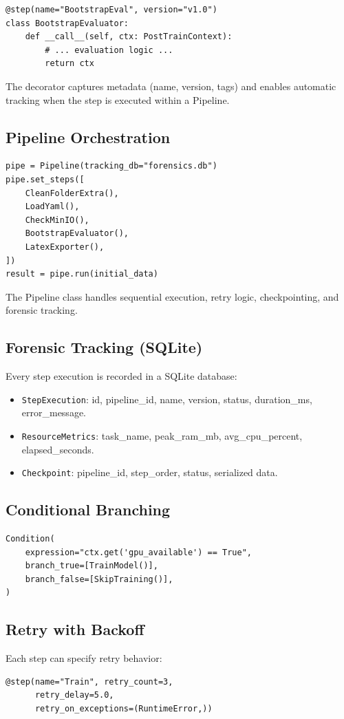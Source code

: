\documentclass[10pt,twocolumn,letterpaper]{article}
\begin{document}
\begin{verbatim}
@step(name="BootstrapEval", version="v1.0")
class BootstrapEvaluator:
    def __call__(self, ctx: PostTrainContext):
        # ... evaluation logic ...
        return ctx
\end{verbatim}

The decorator captures metadata (name, version, tags) and enables automatic tracking when the step is executed within a Pipeline.

\subsection{Pipeline Orchestration}
\begin{verbatim}
pipe = Pipeline(tracking_db="forensics.db")
pipe.set_steps([
    CleanFolderExtra(),
    LoadYaml(),
    CheckMinIO(),
    BootstrapEvaluator(),
    LatexExporter(),
])
result = pipe.run(initial_data)
\end{verbatim}

The Pipeline class handles sequential execution, retry logic, checkpointing, and forensic tracking.

\subsection{Forensic Tracking (SQLite)}
Every step execution is recorded in a SQLite database:
\begin{itemize}
    \item \texttt{StepExecution}: id, pipeline\_id, name, version, status, duration\_ms, error\_message.
    \item \texttt{ResourceMetrics}: task\_name, peak\_ram\_mb, avg\_cpu\_percent, elapsed\_seconds.
    \item \texttt{Checkpoint}: pipeline\_id, step\_order, status, serialized data.
\end{itemize}

\subsection{Conditional Branching}
\begin{verbatim}
Condition(
    expression="ctx.get('gpu_available') == True",
    branch_true=[TrainModel()],
    branch_false=[SkipTraining()],
)
\end{verbatim}

\subsection{Retry with Backoff}
Each step can specify retry behavior:
\begin{verbatim}
@step(name="Train", retry_count=3,
      retry_delay=5.0,
      retry_on_exceptions=(RuntimeError,))
\end{verbatim}
\end{document}
